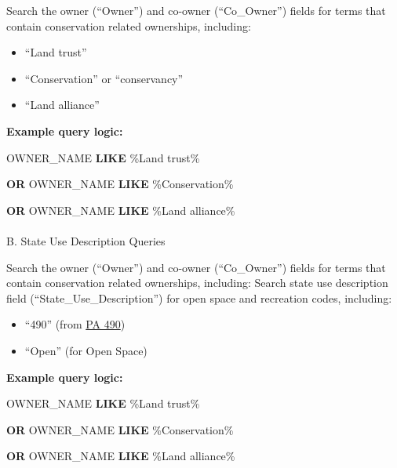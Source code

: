 \documentclass[
  letterpaper,
  DIV=11,
  numbers=noendperiod]{scrreprt}
\makeatletter
\let\oldparagraph\paragraph
\renewcommand{\paragraph}{
    \@ifstar
      \xxxParagraphStar
      \xxxParagraphNoStar
  }
\newcommand{\xxxParagraphStar}[1]{\oldparagraph*{#1}\mbox{}}
\newcommand{\xxxParagraphNoStar}[1]{\oldparagraph{#1}\mbox{}}
\newenvironment{Shaded}{\begin{snugshade}}{\end{snugshade}}
\newcommand{\KeywordTok}[1]{\textcolor[rgb]{0.00,0.23,0.31}{\textbf{#1}}}
\newcommand{\NormalTok}[1]{\textcolor[rgb]{0.00,0.23,0.31}{#1}}
\newcommand{\StringTok}[1]{\textcolor[rgb]{0.13,0.47,0.30}{#1}}
\providecommand{\tightlist}{%
  \setlength{\itemsep}{0pt}\setlength{\parskip}{0pt}}
\makeatother
\begin{document}
Search the owner (``Owner'') and co-owner (``Co\_Owner'') fields for
terms that contain conservation related ownerships, including:

\begin{itemize}
\tightlist
\item
  ``Land trust''
\item
  ``Conservation'' or ``conservancy''
\item
  ``Land alliance''
\end{itemize}

\textbf{Example query logic:}

\begin{Shaded}
\begin{Highlighting}[]
\NormalTok{OWNER\_NAME }\KeywordTok{LIKE} \StringTok{\textquotesingle{}\%Land trust\%\textquotesingle{}}

\KeywordTok{OR}\NormalTok{ OWNER\_NAME }\KeywordTok{LIKE} \StringTok{\textquotesingle{}\%Conservation\%\textquotesingle{}}

\KeywordTok{OR}\NormalTok{ OWNER\_NAME }\KeywordTok{LIKE} \StringTok{\textquotesingle{}\%Land alliance\%\textquotesingle{}}
\end{Highlighting}
\end{Shaded}

\paragraph{B. State Use Description
Queries}\label{b.-state-use-description-queries}

Search the owner (``Owner'') and co-owner (``Co\_Owner'') fields for
terms that contain conservation related ownerships, including: Search
state use description field (``State\_Use\_Description'') for open space
and recreation codes, including:

\begin{itemize}
\tightlist
\item
  ``490'' (from
  \href{https://portal.ct.gov/doag/commissioner/commissioner/public-act-490---the-basics?language=en_US}{PA
  490})
\item
  ``Open'' (for Open Space)
\end{itemize}

\textbf{Example query logic:}

\begin{Shaded}
\begin{Highlighting}[]
\NormalTok{OWNER\_NAME }\KeywordTok{LIKE} \StringTok{\textquotesingle{}\%Land trust\%\textquotesingle{}}

\KeywordTok{OR}\NormalTok{ OWNER\_NAME }\KeywordTok{LIKE} \StringTok{\textquotesingle{}\%Conservation\%\textquotesingle{}}

\KeywordTok{OR}\NormalTok{ OWNER\_NAME }\KeywordTok{LIKE} \StringTok{\textquotesingle{}\%Land alliance\%\textquotesingle{}}
\end{Highlighting}
\end{Shaded}
\end{document}
